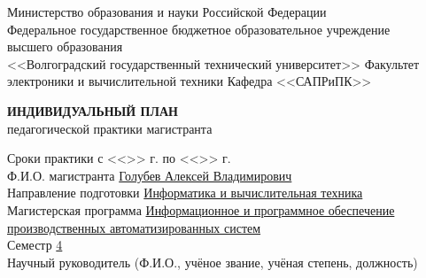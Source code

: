 \documentclass[a4paper, 14pt]{extreport}
\begin{document}
    \onehalfspacing
    \begin{titlepage}
        \begin{center}
            Министерство образования и науки Российской Федерации\\
            Федеральное государственное бюджетное образовательное учреждение\\
            высшего образования\\
            <<Волгоградский государственный технический университет>>
            Факультет электроники и вычислительной техники
            Кафедра <<САПРиПК>>
        \end{center}
        \vspace{2cm}
        \begin{center}
            \large \textbf{ИНДИВИДУАЛЬНЫЙ ПЛАН} \\
            педагогической практики магистранта
        \end{center}
        \vspace{2cm}
        Сроки практики с <<\underline{\hspace{1em}}>> \underline{\hspace{5em}} \the\year г. 
        по <<\underline{\hspace{1em}}>> \underline{\hspace{5em}} \the\year г.\\
        Ф.И.О. магистранта \underline{Голубев Алексей Владимирович\hspace{10.7em}} \\
        Направление подготовки \underline{Информатика и вычислительная техника\hspace{4.9em}} \\
        Магистерская программа \underline{Информационное и программное обеспечение\hspace{2.3em}}\\
        \underline{производственных автоматизированных систем\hspace{13em}} \\
        Семестр \underline{\hspace{1cm}4\hspace{1cm}} \\

        \noindent Научный руководитель (Ф.И.О., учёное звание, учёная степень, должность)\\
        \underline{\hspace{\textwidth}}\\
        \underline{\hspace{\textwidth}}\\
        \underline{\hspace{\textwidth}}
    \end{titlepage}
\end{document}
